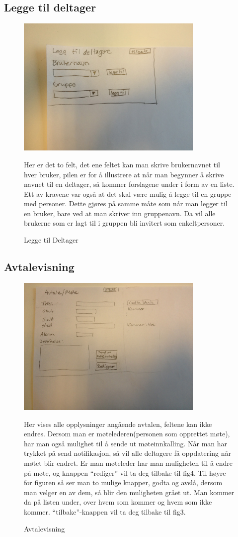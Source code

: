 \newpage


\subsection{Legge til deltager}
\begin{figure}[ht!]
\includegraphics[width=90mm]{fig6.jpg}
\caption{ Legge til Deltager}
Her er det to felt, det ene feltet kan man skrive brukernavnet til hver bruker, pilen er for å illustrere at når man begynner å skrive navnet til en deltager, så kommer forslagene under i form av en liste. Ett av kravene var også at det skal være mulig å legge til en gruppe med personer. Dette gjøres på samme måte som når man legger til en bruker, bare ved at man skriver inn gruppenavn. Da vil alle brukerne som er lagt til i gruppen bli invitert som enkeltpersoner.
\end{figure}

\newpage
\subsection{Avtalevisning}
\begin{figure}[ht!]
\includegraphics[width=90mm]{fig7.jpg}
\caption{Avtalevisning}
Her vises alle opplysninger angående avtalen, feltene kan ikke endres. Dersom man er møtelederen(personen som opprettet møte), har man også mulighet til å sende ut møteinnkalling. Når man har trykket på send notifikasjon, så vil alle deltagere få oppdatering når møtet blir endret. Er man møteleder har man muligheten til å endre på møte, og knappen “rediger” vil ta deg tilbake til fig4. Til høyre for figuren så ser man to mulige knapper, godta og avslå, dersom man velger en av dem, så blir den muligheten grået ut. Man kommer da på listen under, over hvem som kommer og hvem som ikke kommer. “tilbake”-knappen vil ta deg tilbake til fig3.
\end{figure}